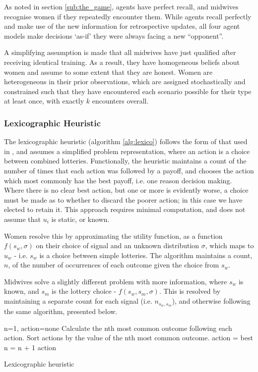 As noted in section \ref{sub:the_game}, agents have perfect recall, and midwives recognise women if they repeatedly encounter them. While agents recall perfectly and make use of the new information for retrospective updates, all four agent models make decisions `as-if' they were always facing a new \enquote{opponent}.

A simplifying assumption is made that all midwives have just qualified after receiving identical training. As a result, they have homogeneous beliefs about  women and assume to some extent that they are honest.
Women are heterogeneous in their prior observations, which are assigned stochastically and constrained such that they have encountered each scenario possible for their type at least once, with exactly \(k\) encounters overall.


\subsubsection{Lexicographic Heuristic}
\label{sub:lexico}

The lexicographic heuristic (algorithm \ref{alg:lexico}) follows the form of that used in \cite{Hau2008}, and assumes a simplified problem representation, where an action is a choice between combined lotteries. Functionally, the heuristic maintains a count of the number of times that each action was followed by a payoff, and chooses the action which most commonly has the best payoff, i.e. one reason decision making. Where there is no clear best action, but one or more is evidently worse, a choice must be made as to whether to discard the poorer action; in this case we have elected to retain it.
This approach requires minimal computation, and does not assume that \(u_{i}\) is static, or known.

Women resolve this by approximating the utility function, as a function \(f(s_{w}, \sigma)\) on their choice of signal and an unknown distribution $\sigma$, which maps to \(u_{w}\) - i.e. \(s_{w}\) is a choice between simple lotteries. The algorithm maintains a count, \(n\), of the number of occurrences of each outcome given the choice from \(s_{w}\).

Midwives solve a slightly different problem with more information, where \(s_{w}\) is known, and \(s_{m}\) is the lottery choice - \(f(s_{w}, s_{m},\sigma)\). This is resolved by maintaining a separate count for each signal (i.e. \(n_{s_{w},s_{m}}\)), and otherwise following the same algorithm, presented below.

\begin{algorithm}
\begin{algorithmic}
\State n=1, action=none
\State Calculate the nth most common outcome following each action.
\State Sort actions by the value of the nth most common outcome.
 \State action = best \EndIf
\State n = n + 1
\EndWhile
\State \Return action
\end{algorithmic}
\caption{Lexicographic heuristic\label{alg:lexico}}
\end{algorithm}

